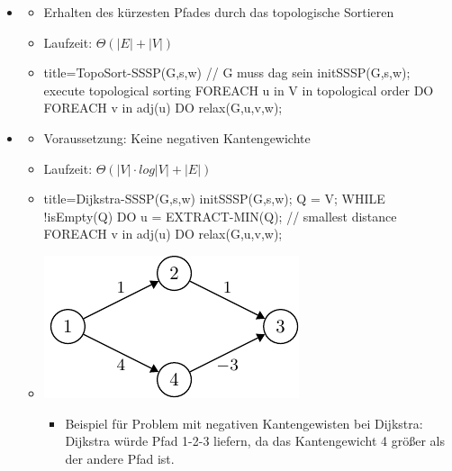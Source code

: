 \documentclass[
    12pt,
    a4paper,
    ngerman,
    color=3b,%
    marginpar=false,
    colorback=false,
    leqno,
]{tudaexercise}
\begin{document}
\begin{itemize}
        \item {}
            \begin{itemize}
                \item Erhalten des kürzesten Pfades durch das topologische Sortieren
                \item Laufzeit: $\Theta(|E| + |V|)$
                \item[]
                    \begin{ccode}[autogobble]{title={TopoSort-SSSP(G,s,w)    // G muss dag sein}}
                    initSSSP(G,s,w);
                    execute topological sorting
                    FOREACH u in V in topological order DO
                        FOREACH v in adj(u) DO
                            relax(G,u,v,w);
                    \end{ccode}
            \end{itemize}

        \item {}
            \begin{itemize}
                \item Voraussetzung: Keine negativen Kantengewichte
                \item Laufzeit: $\Theta(|V| \cdot log|V| + |E|)$
                \item[]
                    \begin{ccode}[autogobble]{title={Dijkstra-SSSP(G,s,w)}}
                    initSSSP(G,s,w);
                    Q = V;
                    WHILE !isEmpty(Q) DO
                        u = EXTRACT-MIN(Q);     // smallest distance
                        FOREACH v in adj(u) DO
                            relax(G,u,v,w);
                    \end{ccode}
                \item \begin{minipage}{.3\textwidth}
                    \includegraphics[]{pictures/dijkstra-fail-graph/dijkstra-fail-graph}
                \end{minipage}
                \begin{minipage}{.5\textwidth}
                    \begin{itemize}
                        \item Beispiel für Problem mit negativen Kantengewisten bei Dijkstra: Dijkstra würde Pfad 1-2-3 liefern, da das Kantengewicht 4 größer als der andere Pfad ist.
                    \end{itemize}
                \end{minipage}
            \end{itemize}
    \end{itemize}
\clearpage
\end{document}
